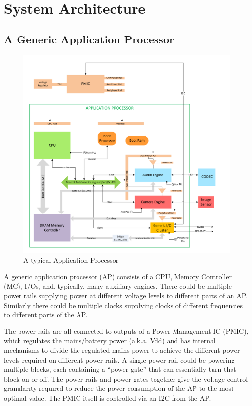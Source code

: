 \part{System Architecture}
\chapter{A Generic Application Processor}
\label{chap:genericAP}
	\begin{figure}[h]
	\centering
	\includegraphics[width = \textwidth]{partSys/GenericApplicationProcessor}
	\caption{A typical Application Processor}
	\label{fig:genericAP}
	\end{figure}

A generic application processor (AP) consists of a CPU, Memory Controller (MC), I/Os, and, typically, many auxiliary engines. There could be multiple power rails supplying power at different voltage levels to different parts of an AP. Similarly there could be multiple clocks supplying clocks of different frequencies to different parts of the AP. 
	
The power rails are all connected to outputs of a Power Management IC (PMIC), which regulates the mains/battery power (a.k.a. Vdd) and has internal mechanisms to divide the regulated mains power to achieve the different power levels required on different power rails. A single power rail could be powering multiple blocks, each containing a ``power gate'' that can essentially turn that block on or off. The power rails and power gates together give the voltage control granularity required to reduce the power consumption of the AP to the most optimal value. The PMIC itself is controlled via an I2C from the AP. 

